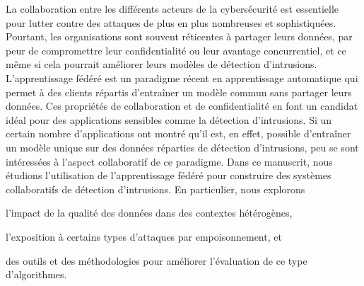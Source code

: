 La collaboration entre les différents acteurs de la cybersécurité est essentielle pour lutter contre des attaques de plus en plus nombreuses et sophistiquées.
Pourtant, les organisations sont souvent réticentes à partager leurs données, par peur de compromettre leur confidentialité ou leur avantage concurrentiel, et ce même si cela pourrait améliorer leurs modèles de détection d'intrusions.
L'apprentissage fédéré est un paradigme récent en apprentissage automatique qui permet à des clients répartis d'entraîner un modèle commun sans partager leurs données.
Ces propriétés de collaboration et de confidentialité en font un candidat idéal pour des applications sensibles comme la détection d'intrusions.
Si un certain nombre d'applications ont montré qu'il est, en effet, possible d'entraîner un modèle unique sur des données réparties de détection d'intrusions, peu se sont intéressées à l'aspect collaboratif de ce paradigme.
%
Dans ce manuscrit, nous étudions l'utilisation de l'apprentissage fédéré pour construire des systèmes collaboratifs de détection d'intrusions.
En particulier, nous explorons
\begin{enumerate*}[label={\small(\roman*)}]
  \item l'impact de la qualité des données dans des contextes hétérogènes,
  \item l'exposition à certains types d'attaques par empoisonnement, et
  \item des outils et des méthodologies pour améliorer l'évaluation de ce type d'algorithmes.
\end{enumerate*}